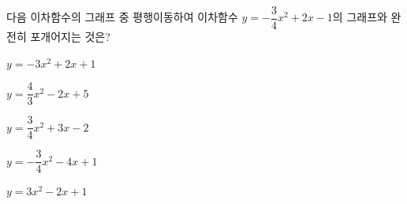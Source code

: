 다음 이차함수의 그래프 중 평행이동하여 이차함수 $y=-\dfrac{3}{4}x^2+2x-1$의 그래프와 완전히 포개어지는 것은?
\begin{choicesii}{\rule[-3ex]{0pt}{8ex}$y=-3x^2+2x+1$}{\rule[-3ex]{0pt}{8ex}$y=\dfrac{4}{3}x^2-2x+5$}{\rule[-3ex]{0pt}{8ex}$y=\dfrac{3}{4}x^2+3x-2$}{\rule[-3ex]{0pt}{8ex}$y=-\dfrac{3}{4}x^2-4x+1$}{\rule[-3ex]{0pt}{8ex}$y=3x^2-2x+1$}\end{choicesii}
